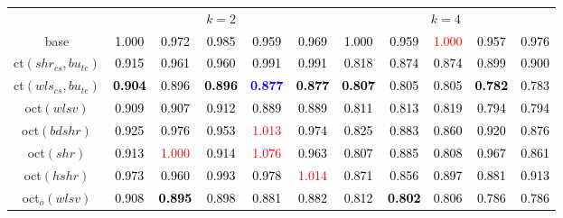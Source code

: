 \begin{tabular}[t]{c|>{}cccc>{}c|ccccc}
\multicolumn{1}{c}{} & \multicolumn{5}{c}{\textbf{$k = 2$}} & \multicolumn{5}{c}{\textbf{$k = 4$}}\\
base & \textcolor{black}{1.000} & \textcolor{black}{0.972} & \textcolor{black}{0.985} & \textcolor{black}{0.959} & \textcolor{black}{0.969} & \textcolor{black}{1.000} & \textcolor{black}{0.959} & \textcolor{red}{1.000} & \textcolor{black}{0.957} & \textcolor{black}{0.976}\\
ct$(shr_{cs}, bu_{te})$ & \textcolor{black}{0.915} & \textcolor{black}{0.961} & \textcolor{black}{0.960} & \textcolor{black}{0.991} & \textcolor{black}{0.991} & \textcolor{black}{0.818} & \textcolor{black}{0.874} & \textcolor{black}{0.874} & \textcolor{black}{0.899} & \textcolor{black}{0.900}\\
ct$(wls_{cs}, bu_{te})$ & \textcolor{black}{\textbf{0.904}} & \textcolor{black}{0.896} & \textcolor{black}{\textbf{0.896}} & \textcolor{blue}{\textbf{0.877}} & \textcolor{black}{\textbf{0.877}} & \textcolor{black}{\textbf{0.807}} & \textcolor{black}{0.805} & \textcolor{black}{0.805} & \textcolor{black}{\textbf{0.782}} & \textcolor{black}{0.783}\\
oct$(wlsv)$ & \textcolor{black}{0.909} & \textcolor{black}{0.907} & \textcolor{black}{0.912} & \textcolor{black}{0.889} & \textcolor{black}{0.889} & \textcolor{black}{0.811} & \textcolor{black}{0.813} & \textcolor{black}{0.819} & \textcolor{black}{0.794} & \textcolor{black}{0.794}\\
oct$(bdshr)$ & \textcolor{black}{0.925} & \textcolor{black}{0.976} & \textcolor{black}{0.953} & \textcolor{red}{1.013} & \textcolor{black}{0.974} & \textcolor{black}{0.825} & \textcolor{black}{0.883} & \textcolor{black}{0.860} & \textcolor{black}{0.920} & \textcolor{black}{0.876}\\
oct$(shr)$ & \textcolor{black}{0.913} & \textcolor{red}{1.000} & \textcolor{black}{0.914} & \textcolor{red}{1.076} & \textcolor{black}{0.963} & \textcolor{black}{0.807} & \textcolor{black}{0.885} & \textcolor{black}{0.808} & \textcolor{black}{0.967} & \textcolor{black}{0.861}\\
oct$(hshr)$ & \textcolor{black}{0.973} & \textcolor{black}{0.960} & \textcolor{black}{0.993} & \textcolor{black}{0.978} & \textcolor{red}{1.014} & \textcolor{black}{0.871} & \textcolor{black}{0.856} & \textcolor{black}{0.897} & \textcolor{black}{0.881} & \textcolor{black}{0.913}\\
oct$_o(wlsv)$ & \textcolor{black}{0.908} & \textcolor{black}{\textbf{0.895}} & \textcolor{black}{0.898} & \textcolor{black}{0.881} & \textcolor{black}{0.882} & \textcolor{black}{0.812} & \textcolor{black}{\textbf{0.802}} & \textcolor{black}{0.806} & \textcolor{black}{0.786} & \textcolor{black}{0.786}\\

\end{tabular}
